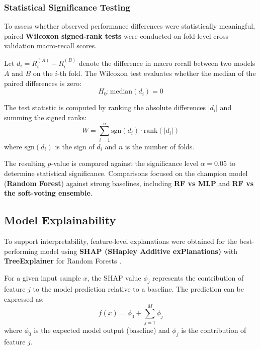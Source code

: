 \documentclass[sigconf]{acmart}
\begin{document}
\subsubsection{Statistical Significance Testing}
\label{subsubsec:wilcoxon}

To assess whether observed performance differences were statistically meaningful, paired \textbf{Wilcoxon signed-rank tests} \cite{wilcoxon1945} were conducted on fold-level cross-validation macro-recall scores.

Let $d_i = R_i^{(A)} - R_i^{(B)}$ denote the difference in macro recall between two models $A$ and $B$ on the $i$-th fold. The Wilcoxon test evaluates whether the median of the paired differences is zero:
\begin{equation}
\label{eq:wilcoxon_h0}
H_0: \text{median}(d_i) = 0
\end{equation}

The test statistic is computed by ranking the absolute differences $|d_i|$ and summing the signed ranks:
\begin{equation}
\label{eq:wilcoxon_w}
W = \sum_{i=1}^{n} \text{sgn}(d_i) \cdot \text{rank}(|d_i|)
\end{equation}
where $\text{sgn}(d_i)$ is the sign of $d_i$ and $n$ is the number of folds.

The resulting $p$-value is compared against the significance level $\alpha = 0.05$ to determine statistical significance. Comparisons focused on the champion model (\textbf{Random Forest}) against strong baselines, including \textbf{RF vs MLP} and \textbf{RF vs the soft-voting ensemble}.

\subsection{Model Explainability}
\label{subsec:shap}

To support interpretability, feature-level explanations were obtained for the best-performing model using \textbf{SHAP (SHapley Additive exPlanations)} with \textbf{TreeExplainer} for Random Forests \cite{lundberg2017}.

For a given input sample $x$, the SHAP value $\phi_j$ represents the contribution of feature $j$ to the model prediction relative to a baseline. The prediction can be expressed as:
\begin{equation}
\label{eq:shap}
f(x) = \phi_0 + \sum_{j=1}^{M} \phi_j
\end{equation}
where $\phi_0$ is the expected model output (baseline) and $\phi_j$ is the contribution of feature $j$.
\end{document}
